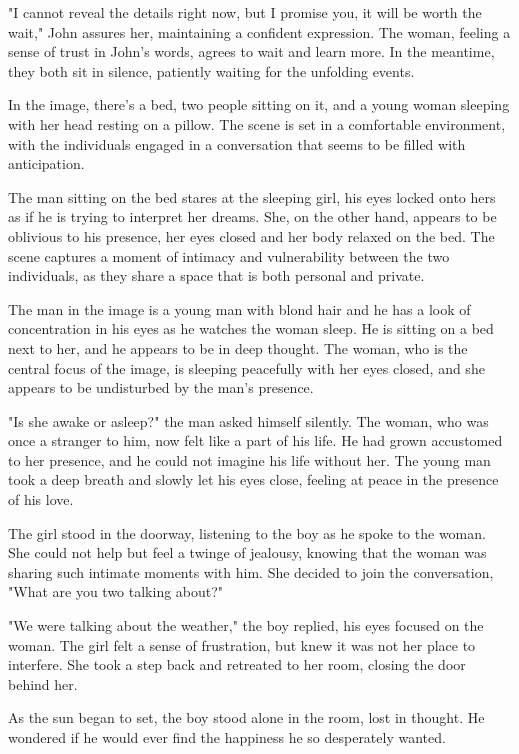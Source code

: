 \documentclass[smalldemyvopaper,11pt,twoside,onecolumn,openright,extrafontsizes]{memoir}
\begin{document}
"I cannot reveal the details right now, but I promise you, it will be worth the wait," John assures her, maintaining a confident expression. The woman, feeling a sense of trust in John's words, agrees to wait and learn more. In the meantime, they both sit in silence, patiently waiting for the unfolding events.\par
In the image, there's a bed, two people sitting on it, and a young woman sleeping with her head resting on a pillow. The scene is set in a comfortable environment, with the individuals engaged in a conversation that seems to be filled with anticipation.\par
The man sitting on the bed stares at the sleeping girl, his eyes locked onto hers as if he is trying to interpret her dreams. She, on the other hand, appears to be oblivious to his presence, her eyes closed and her body relaxed on the bed. The scene captures a moment of intimacy and vulnerability between the two individuals, as they share a space that is both personal and private.\par
The man in the image is a young man with blond hair and he has a look of concentration in his eyes as he watches the woman sleep. He is sitting on a bed next to her, and he appears to be in deep thought. The woman, who is the central focus of the image, is sleeping peacefully with her eyes closed, and she appears to be undisturbed by the man's presence.\par
"Is she awake or asleep?" the man asked himself silently. The woman, who was once a stranger to him, now felt like a part of his life. He had grown accustomed to her presence, and he could not imagine his life without her. The young man took a deep breath and slowly let his eyes close, feeling at peace in the presence of his love.\par
The girl stood in the doorway, listening to the boy as he spoke to the woman. She could not help but feel a twinge of jealousy, knowing that the woman was sharing such intimate moments with him. She decided to join the conversation, "What are you two talking about?"\par
"We were talking about the weather," the boy replied, his eyes focused on the woman. The girl felt a sense of frustration, but knew it was not her place to interfere. She took a step back and retreated to her room, closing the door behind her.\par
As the sun began to set, the boy stood alone in the room, lost in thought. He wondered if he would ever find the happiness he so desperately wanted.\par
\end{document}
